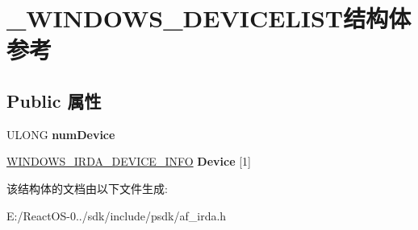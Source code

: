 \hypertarget{struct___w_i_n_d_o_w_s___d_e_v_i_c_e_l_i_s_t}{}\section{\+\_\+\+W\+I\+N\+D\+O\+W\+S\+\_\+\+D\+E\+V\+I\+C\+E\+L\+I\+S\+T结构体 参考}
\label{struct___w_i_n_d_o_w_s___d_e_v_i_c_e_l_i_s_t}
\subsection*{Public 属性}
\begin{DoxyCompactItemize}
\item 
\mbox{\label{struct___w_i_n_d_o_w_s___d_e_v_i_c_e_l_i_s_t_ab63c18b360c86b338f8c094e19bd363f}} 
U\+L\+O\+NG {\bfseries num\+Device}
\item 
\mbox{\label{struct___w_i_n_d_o_w_s___d_e_v_i_c_e_l_i_s_t_a72af9c0917afeb86169dd1d16deee7e4}} 
\hyperlink{struct___w_i_n_d_o_w_s___i_r_d_a___d_e_v_i_c_e___i_n_f_o}{W\+I\+N\+D\+O\+W\+S\+\_\+\+I\+R\+D\+A\+\_\+\+D\+E\+V\+I\+C\+E\+\_\+\+I\+N\+FO} {\bfseries Device} \mbox{[}1\mbox{]}
\end{DoxyCompactItemize}


该结构体的文档由以下文件生成\+:\begin{DoxyCompactItemize}
\item 
E\+:/\+React\+O\+S-\/0../sdk/include/psdk/af\+\_\+irda.\+h\end{DoxyCompactItemize}
